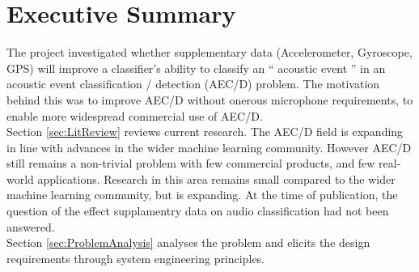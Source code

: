 \documentclass{UoNMCHA}
\newcommand{\inlineQuote}[1]{`` #1 ''}
\newcommand{\sref}[1] {Section \ref{#1}}
\numberwithin{equation}{section}
\begin{document}

\newpage

\vspace{-5mm}
\section*{Executive Summary}
\vspace{-3mm}
The project investigated whether supplementary data (Accelerometer, Gyroscope, GPS) will improve a classifier's ability to classify an \inlineQuote{acoustic event} in an acoustic event classification / detection (AEC/D) problem. The motivation behind this was to improve AEC/D without onerous microphone requirements, to enable more widespread commercial use of AEC/D.\\

\sref{sec:LitReview} reviews current research. The AEC/D field is expanding in line with advances in the wider machine learning community. However AEC/D still remains a non-trivial problem with few commercial products, and few real-world applications. Research in this area remains small compared to the wider machine learning community, but is expanding. At the time of publication, the question of the effect supplamentry data on audio classification had not been answered. \\

\sref{sec:ProblemAnalysis} analyses the problem and elicits the design requirements through system engineering principles.\\
\end{document}
